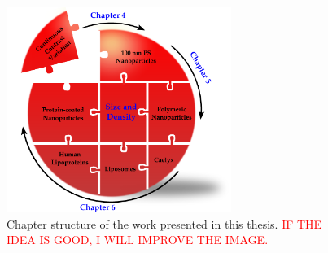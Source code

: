 \begin{figure}[hbt]%
	\centering
		\includegraphics[width=0.65\textwidth]{Figures/ThesisStructure.pdf}
		\caption[Structure of the thesis.]{Chapter structure of the work presented in this thesis. \textcolor{red}{IF THE IDEA IS GOOD, I WILL IMPROVE THE IMAGE.}}
		\label{fig:ThesisStructure}
\end{figure}





